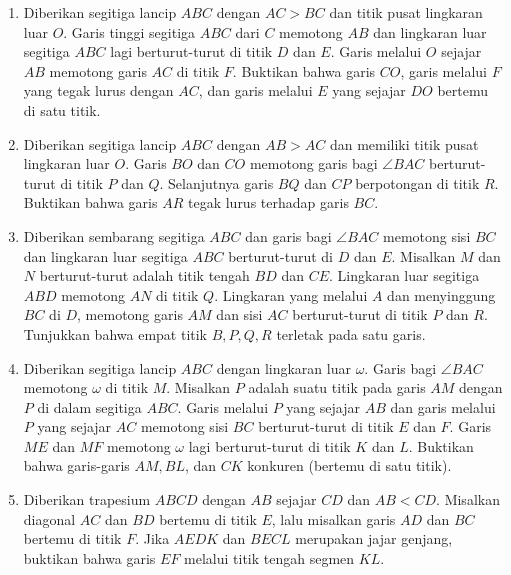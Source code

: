 \documentclass[12pt]{scrartcl}
\begin{document}
\begin{enumerate}
		\item
		Diberikan segitiga lancip $ABC$ dengan $AC > BC$ dan titik pusat lingkaran luar $O$. Garis tinggi segitiga $ABC$ dari $C$ memotong $AB$ dan lingkaran luar segitiga $ABC$ lagi berturut-turut di titik $D$ dan $E$. Garis melalui $O$ sejajar $AB$ memotong garis $AC$ di titik $F$. Buktikan bahwa garis $CO$, garis melalui $F$ yang tegak lurus dengan $AC$, dan garis melalui $E$ yang sejajar $DO$ bertemu di satu titik.
		
		\item
		Diberikan segitiga lancip $ABC$ dengan $AB > AC$ dan memiliki titik pusat lingkaran luar $O$. Garis $BO$ dan $CO$ memotong garis bagi $\angle BAC$ berturut-turut di titik $P$ dan $Q$. Selanjutnya garis $BQ$ dan $CP$ berpotongan di titik $R$. Buktikan bahwa garis $AR$ tegak lurus terhadap garis $BC$.
		
		\item
		Diberikan sembarang segitiga $ABC$ dan garis bagi $\angle BAC$ memotong sisi $BC$ dan lingkaran luar segitiga $ABC$ berturut-turut di $D$ dan $E$. Misalkan $M$ dan $N$ berturut-turut adalah titik tengah $BD$ dan $CE$. Lingkaran luar segitiga $ABD$ memotong $AN$ di titik $Q$. Lingkaran yang melalui $A$ dan menyinggung $BC$ di $D$, memotong garis $AM$ dan sisi $AC$ berturut-turut di titik $P$ dan $R$. Tunjukkan bahwa empat titik $B,P,Q,R$ terletak pada satu garis.
		
		\item
		Diberikan segitiga lancip $ABC$ dengan lingkaran luar $\omega$. Garis bagi $\angle BAC$ memotong $\omega$ di titik $M$. Misalkan $P$ adalah suatu titik pada garis $AM$ dengan $P$ di dalam segitiga $ABC$. Garis melalui $P$ yang sejajar $AB$ dan garis melalui $P$ yang sejajar $AC$ memotong sisi $BC$ berturut-turut di titik $E$ dan $F$. Garis $ME$ dan $MF$ memotong $\omega$ lagi berturut-turut di titik $K$ dan $L$. Buktikan bahwa garis-garis $AM,BL$, dan $CK$ konkuren (bertemu di satu titik).
		
		\item
		Diberikan trapesium $ABCD$ dengan $AB$ sejajar $CD$ dan $AB<CD$. Misalkan diagonal $AC$ dan $BD$ bertemu di titik $E$, lalu misalkan garis $AD$ dan $BC$ bertemu di titik $F$. Jika $AEDK$ dan $BECL$ merupakan jajar genjang, buktikan bahwa garis $EF$ melalui titik tengah segmen $KL$.
		
		
	\end{enumerate}
	
	
\end{document}
